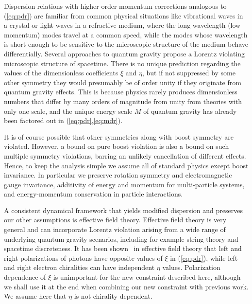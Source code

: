 \documentclass[12pt]{article}
\begin{document}
Dispersion relations with higher order momentum
corrections analogous to (\ref{eq:pdr}) are familiar from
common physical situations like vibrational waves in a
crystal or light waves in a refractive medium, where the
long wavelength (low momentum) modes travel at a common
speed, while the modes whose wavelength is short enough
to be sensitive to the microscopic structure of the
medium behave differentially. Several approaches to
quantum gravity propose a Lorentz violating microscopic
structure of spacetime.  There is no unique prediction
regarding the values of the dimensionless coefficients
$\xi$ and $\eta$, but if not suppressed by some other
symmetry they would presumably be of order unity if they
originate from quantum gravity effects. This is because
physics rarely produces dimensionless numbers that differ
by many orders of magnitude from unity from theories with
only one scale, and the unique energy scale $M$ of
quantum gravity has already been factored out in
(\ref{eq:pdr},\ref{eq:mdr}).

It is of course possible that other symmetries along with
boost symmetry are violated.   However, a bound on pure boost
violation is also a bound on such multiple symmetry violations,
barring an unlikely cancellation of different effects.  Hence, to
keep the analysis simple we assume all of standard physics except
boost invariance. In particular we preserve rotation symmetry and
electromagnetic gauge invariance, additivity of energy and
momentum for multi-particle systems, and energy-momentum
conservation in particle interactions.

A consistent dynamical framework that yields modified dispersion
and preserves our other assumptions is effective field theory.
Effective field theory is very general and can incorporate Lorentz
violation arising from a wide range of underlying quantum gravity
scenarios, including for example string theory and spacetime
discreteness. It has been shown~\cite{MP} in effective field
theory that left and right polarizations of photons have opposite
values of $\xi$ in (\ref{eq:pdr}), while left and right electron
chiralities can have independent $\eta$ values. Polarization
dependence of $\xi$ is unimportant for the new constraint
described here, although we shall use it at the end when
combining our new constraint with previous work. We assume here
that $\eta$ is not chirality dependent.
\end{document}
